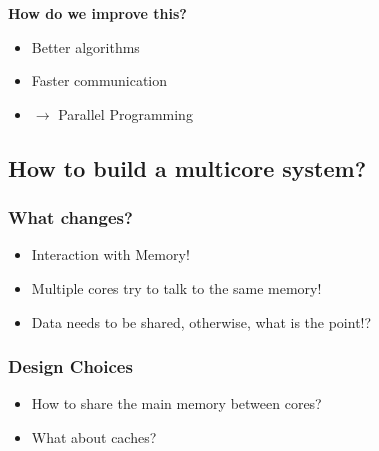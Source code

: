 \documentclass[10pt]{article}
\begin{document}
\textbf{How do we improve this?}
\begin{itemize}
    \item Better algorithms
    \item Faster communication
    \item $\rightarrow$ Parallel Programming
\end{itemize}
\subsection*{How to build a multicore system?}
\subsubsection*{What changes?}
\begin{itemize}
    \item Interaction with Memory!
    \item Multiple cores try to talk to the same memory!
    \item Data needs to be shared, otherwise, what is the point!?
\end{itemize}
\subsubsection*{Design Choices}
\begin{itemize}
    \item How to share the main memory between cores?
    \item What about caches?
\end{itemize}
\end{document}
